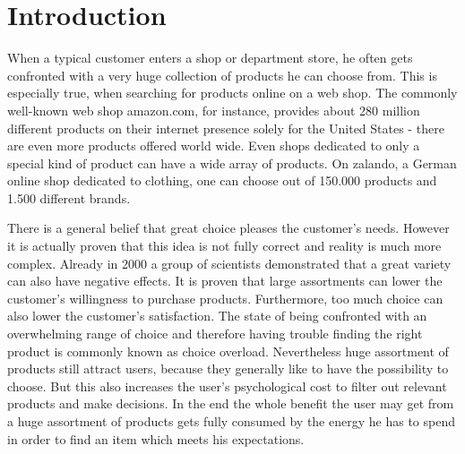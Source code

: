
\section{Introduction}
\iffalse
{\color{red} 
TODO:
\begin{itemize}
    \item item == document
    \item web-api
    \item doc-comments in source code
    \imte use case
\end{itemize}
}
\fi

\noindent
When a typical customer enters a shop or department store, he often gets confronted with a very huge collection of products he can choose from.
This is especially true, when searching for products online on a web shop.
The commonly well-known web shop \gls{amazon.com}, for instance, provides about 280 million different products on their internet presence solely for the United States - there are even more products offered world wide.\citep{marketplaceanalytics:2014}
Even shops dedicated to only a special kind of product can have a wide array of products.
On \gls{zalando}, a German online shop dedicated to clothing, one can choose out of 150.000 products and 1.500 different brands.\citep{visser:2014}

There is a general belief that great choice pleases the customer's needs.
However it is actually proven that this idea is not fully correct and reality is much more complex.
Already in 2000 a group of scientists demonstrated that a great variety can also have negative effects.
It is proven that large assortments can lower the customer's willingness to purchase products.\citep[p.~312-313]{diehl:2010}
Furthermore, too much choice can also lower the customer's satisfaction.\citep[p.~320]{diehl:2010}
The state of being confronted with an overwhelming range of choice and therefore having trouble finding the right product is commonly known as choice overload.\citep[p.~454]{stanton:2012}
Nevertheless huge assortment of products still attract users, because they generally like to have the possibility to choose.
But this also increases the user's psychological cost to filter out relevant products and make decisions.
In the end the whole benefit the user may get from a huge assortment of products gets fully consumed by the energy he has to spend in order to find an item which meets his expectations.
\citep[p.~64]{bollen:2010}

